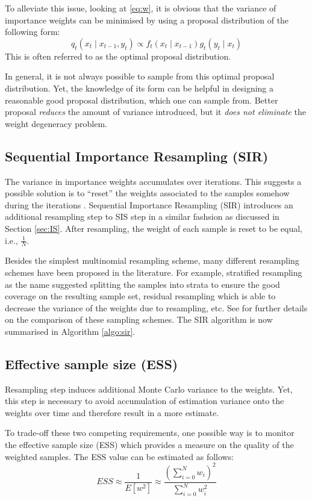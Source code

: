 To alleviate this issue, looking at \eqref{eq:w}, it is obvious that the variance of importance weights can be minimised by using a proposal distribution of the following form:
\begin{equation}
 q_{t}(x_{t} \mid x_{t-1}, y_t) \propto f_{t}(x_{t} \mid x_{t-1}) g_{t}(y_{t} \mid x_t)
\end{equation}
This is often referred to as the optimal proposal distribution.

In general, it is not always possible to sample from this optimal proposal distribution. Yet, the knowledge of its form can be helpful in designing a reasonable good proposal distribution, which one can sample from. Better
proposal \emph{reduces} the amount of variance introduced, but it \emph{does not eliminate} the weight degeneracy problem.

\subsection{Sequential Importance Resampling (SIR)}
The variance in importance weights accumulates over iterations. This suggests a possible solution is to ``reset'' the weights associated to the samples somehow during the iterations \cite{JAM10}. Sequential Importance Resampling (SIR) introduces an additional resampling step to SIS step in a similar fashsion as discussed in Section \ref{sec:IS}. After resampling, the weight of each sample is reset to be equal, i.e., $\frac{1}{N}$.

Besides the simplest multinomial resampling scheme, many different resampling schemes have been proposed in the literature. For example, stratified resampling \cite{KG96} as the name suggested splitting the samples into strata to ensure the good coverage on the resulting sample set, residual resampling \cite{JSL98} which is able to decrease the variance of the weights due to resampling, etc. See \cite{DR05} for further details on the comparison of these sampling schemes.  The SIR algorithm is now summarised in Algorithm \ref{algo:sir}.

\subsection{Effective sample size (ESS)}
Resampling step induces additional Monte Carlo variance to the weights. Yet, this step is necessary to avoid accumulation of estimation variance onto the weights over time and therefore result in a more estimate.

To trade-off these two competing requirements, one possible way is to monitor the effective sample size (ESS) which provides a measure on the quality of the weighted samples. The ESS value can be estimated as follows:
\begin{equation}
  ESS \approx \dfrac{1}{E[w^2]} \approx \dfrac{\left(\sum^N_{i=0} w_i \right)^2}{\sum^N_{i=0}w_i^2}
\end{equation}

